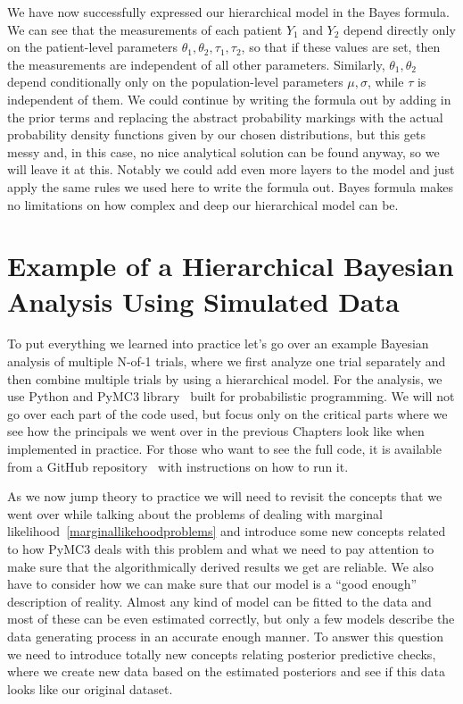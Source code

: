 \documentclass[12pt,a4paper,leqno]{report}
\theoremstyle{plain}
\theoremstyle{definition}
\theoremstyle{remark}
\begin{document}
We have now successfully expressed our hierarchical model in the Bayes formula.
We can see that the measurements of each patient \(Y_1 \) and \(Y_2 \) depend directly
only on the patient-level parameters \(\theta_1, \theta_2, \tau_1, \tau_2\), so that if these values are set, then the
measurements are independent of all other parameters. Similarly, \(\theta_1, \theta_2 \) depend conditionally only
on the population-level parameters \(\mu, \sigma \), while \(\tau \) is independent of
them. We could continue by writing the
formula out by adding in the prior terms and replacing the abstract probability
markings with the actual probability density functions given by our chosen
distributions, but this gets messy and, in this case, no nice analytical solution can be
found anyway, so we will leave it at this. Notably we could add even
more layers to the model and just apply the same rules we used here to write the formula
out. Bayes formula makes no limitations on how complex and deep our hierarchical model
can be.

\chapter{Example of a Hierarchical Bayesian Analysis Using Simulated Data}

To put everything we learned into practice let's go over an example Bayesian
analysis of multiple N-of-1 trials, where we first analyze one trial separately and then
combine multiple trials by using a hierarchical model. For the analysis, we use Python and PyMC3 library\ \cite{pymc3} built
for probabilistic programming. We will not go over each part of the code used, but focus only
on the critical parts where we see how the principals we went over in the
previous Chapters look like when implemented in practice. For those who want to see the
full code, it is available from a GitHub repository\ \cite{github} with instructions on how
to run it.

As we now jump theory to practice we will need to revisit the concepts that we went over
while talking about the problems of dealing with marginal likelihood\
\ref{marginallikehoodproblems} and introduce some new concepts related to how
PyMC3 deals with this problem and what we need to pay attention to
make sure that the algorithmically derived results we get are reliable. We also have to
consider how we can make sure that our model is a ``good enough'' description of reality.
Almost any kind of model can be fitted to the data and most of these can be even
estimated correctly, but only a few models describe the data generating process in an
accurate enough manner. To answer this question we need to introduce totally new concepts
relating posterior predictive checks, where we create new data based on the estimated
posteriors and see if this data looks like our original dataset.
\end{document}
